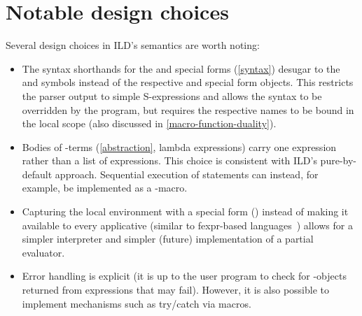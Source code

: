 \section{Notable design choices}
\label{design-choices}
Several design choices in ILD's semantics are worth noting:
\begin{itemize}
\item The syntax shorthands for the  and 
special forms (\cref{syntax}) desugar to the  and 
symbols instead of the respective  and  special form objects.
This restricts the parser output to simple S-expressions and allows the syntax to be
overridden by the program, but requires the respective names to be bound in the local
scope (also discussed in \cref{macro-function-duality}).
\item Bodies of \ildsetAbstr-terms (\cref{abstraction}, lambda expressions)
carry one expression rather than
a list of expressions. This choice is consistent with ILD's pure-by-default approach.
Sequential execution of statements can instead, for example, be implemented as a -macro.
\item Capturing the local environment with a special form () instead
of making it available to every applicative (similar to fexpr-based languages~\cite{kernel-report})
allows for a simpler interpreter and simpler (future) implementation of a partial evaluator.
\item Error handling is explicit (it is up to the user program to check for \ildfailbare-objects
returned from expressions that may fail). However, it is also possible to implement
mechanisms such as try/catch via macros.
\end{itemize}

